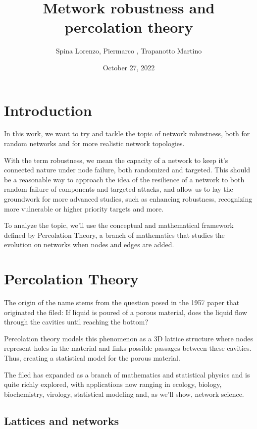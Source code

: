 \documentclass[
]{article}
\title{Metwork robustness and percolation theory}
\author{Spina Lorenzo, Piermarco , Trapanotto Martino}
\date{October 27, 2022}
\begin{document}
\maketitle

\hypertarget{introduction}{%
\section{Introduction}\label{introduction}}

In this work, we want to try and tackle the topic of network robustness,
both for random networks and for more realistic network topologies.

With the term robustness, we mean the capacity of a network to keep it's
connected nature under node failure, both randomized and targeted. This
should be a reasonable way to approach the idea of the resilience of a
network to both random failure of components and targeted attacks, and
allow us to lay the groundwork for more advanced studies, such as
enhancing robustness, recognizing more vulnerable or higher priority
targets and more.

To analyze the topic, we'll use the conceptual and mathematical
framework defined by Percolation Theory, a branch of mathematics that
studies the evolution on networks when nodes and edges are added.

\hypertarget{percolation-theory}{%
\section{Percolation Theory}\label{percolation-theory}}

The origin of the name stems from the question posed in the 1957 paper
that originated the filed: If liquid is poured of a porous material,
does the liquid flow through the cavities until reaching the bottom?

Percolation theory models this phenomenon as a 3D lattice structure
where nodes represent holes in the material and links possible passages
between these cavities. Thus, creating a statistical model for the
porous material.

The filed has expanded as a branch of mathematics and statistical
physics and is quite richly explored, with applications now ranging in
ecology, biology, biochemistry, virology, statistical modeling and, as
we'll show, network science.

\hypertarget{lattices-and-networks}{%
\subsection{Lattices and networks}\label{lattices-and-networks}}
\end{document}
